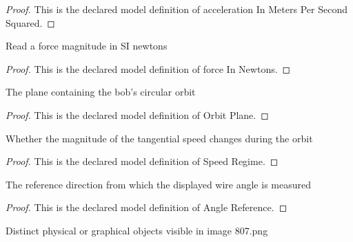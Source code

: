 \begin{proof}
  This is the declared model definition of acceleration In Meters Per Second Squared.
\end{proof}
\begin{definition}
  \label{def:physics:phyx-mini-0807:phyxminiproblems-problemphyxmini0807-forceinnewtons}
  Read a force magnitude in SI newtons
\end{definition}
\begin{proof}
  This is the declared model definition of force In Newtons.
\end{proof}
\begin{definition}
  \label{def:physics:phyx-mini-0807:phyxminiproblems-problemphyxmini0807-orbitplane}
  The plane containing the bob's circular orbit
\end{definition}
\begin{proof}
  This is the declared model definition of Orbit Plane.
\end{proof}
\begin{definition}
  \label{def:physics:phyx-mini-0807:phyxminiproblems-problemphyxmini0807-speedregime}
  Whether the magnitude of the tangential speed changes during the orbit
\end{definition}
\begin{proof}
  This is the declared model definition of Speed Regime.
\end{proof}
\begin{definition}
  \label{def:physics:phyx-mini-0807:phyxminiproblems-problemphyxmini0807-anglereference}
  The reference direction from which the displayed wire angle is measured
\end{definition}
\begin{proof}
  This is the declared model definition of Angle Reference.
\end{proof}
\begin{definition}
  \label{def:physics:phyx-mini-0807:phyxminiproblems-problemphyxmini0807-figureobject}
  Distinct physical or graphical objects visible in image 807.png
\end{definition}
